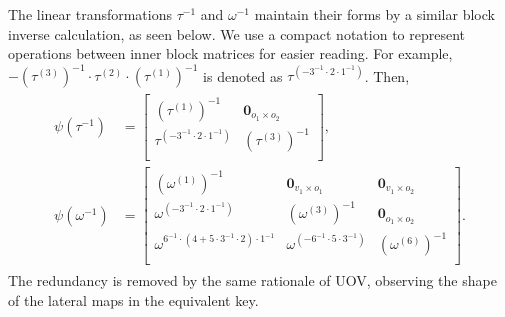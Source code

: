 \documentclass[english]{ufsc-thesis-rn46-2019/ufsc-thesis-rn46-2019}
\theoremstyle{definition}
\begin{document}
The linear transformations $\tau^{-1}$ and $\omega^{-1}$ maintain their forms
by a similar block inverse calculation, as seen below. We use a compact
notation to represent operations between inner block matrices for easier
reading. For example,
$-{(\tau^{(3)})}^{-1} \cdot \tau^{(2)} \cdot {(\tau^{(1)})}^{-1}$ is denoted as
$\tau^{(-3^{-1} \cdot 2 \cdot 1^{-1})}$. Then,
\begin{align}
  \begin{split}
    \psi(\tau^{-1}) &=
    \begin{bmatrix}
      {(\tau^{(1)})}^{-1}                   & \mathbf{0}_{o_{1} \times o_{2}} \\
      \tau^{(-3^{-1} \cdot 2 \cdot 1^{-1})} & {(\tau^{(3)})}^{-1}             \\
    \end{bmatrix}, \\
    \psi(\omega^{-1}) &=
    \begin{bmatrix}
      {(\omega^{(1)})}^{-1}
        & \mathbf{0}_{v_{1} \times o_{1}} & \mathbf{0}_{v_{1} \times o_{2}} \\
      \omega^{(-3^{-1} \cdot 2 \cdot 1^{-1})}
        & {(\omega^{(3)})}^{-1}           & \mathbf{0}_{o_{1} \times o_{2}} \\
      \omega^{6^{-1} \cdot (4 + 5 \cdot 3^{-1} \cdot 2) \cdot 1^{-1}}
        & \omega^{(-6^{-1} \cdot 5 \cdot 3^{-1})} & {(\omega^{(6)})}^{-1}   \\
    \end{bmatrix}.
  \end{split}
\end{align}
The redundancy is removed by the same rationale of UOV, observing the shape
of the lateral maps in the equivalent key.
\end{document}
